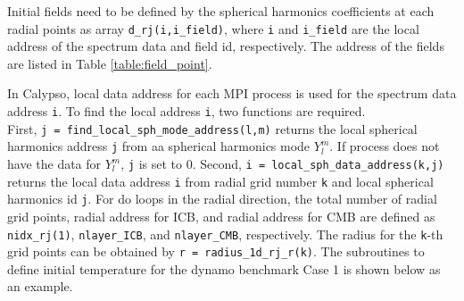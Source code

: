 % 

Initial fields need to be defined by the spherical harmonics coefficients at each radial points as array \verb|d_rj(i,i_field)|, where \verb|i| and \verb|i_field| are the local address of the spectrum data and field id, respectively. The address of the fields are listed in Table \ref{table:field_point}.

In Calypso, local data address for each MPI process is used for the spectrum data address \verb|i|. To find the local address \verb|i|, two functions are required. \\
First, \verb|j = find_local_sph_mode_address(l,m)| returns the local spherical  harmonics address \verb|j| from aa spherical harmonics mode $Y_{l}^{m}$. If process does not have the data for $Y_{l}^{m}$, \verb|j| is set to 0. Second, \verb|i = local_sph_data_address(k,j)| returns the local data address \verb|i| from radial grid number \verb|k| and local spherical harmonics id \verb|j|. For do loops in the radial direction, the total number of radial grid points, radial address for ICB, and radial address for CMB are defined as \verb|nidx_rj(1)|, \verb|nlayer_ICB|, and \verb|nlayer_CMB|, respectively. The radius for the \verb|k|-th grid points can be obtained by \verb|r = radius_1d_rj_r(k)|. The subroutines to define initial temperature for the dynamo benchmark Case 1 is shown below as an example.

